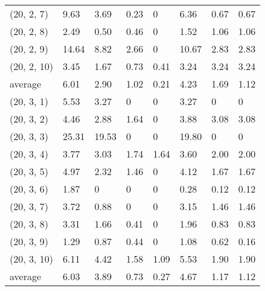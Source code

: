 \begin{appendices}
\begin{table}[H]
\begin{tabular}{  p{1.6cm} | p{0.8cm} | p{1cm} p{1cm} p{1cm} | p{1cm} p{1cm} p{1cm} }
(20, 2, 7) &  9.63  & 3.69  & 0.23  & 0  &6.36  & 0.67  & 0.67  \\
(20, 2, 8) &  2.49  & 0.50  &  0.46 &  0 &  1.52 &  1.06 &  1.06 \\
(20, 2, 9) &   14.64  & 8.82  &  2.66 & 0  & 10.67  & 2.83  &  2.83 \\
(20, 2, 10) &  3.45  & 1.67 & 0.73  & 0.41  & 3.24   & 3.24  & 3.24  \\
\midrule
average & 6.01   &2.90   & 1.02  &  0.21 &4.23  & 1.69  &  1.12 \\
\bottomrule
(20, 3, 1) & 5.53  & 3.27  & 0  &  0 & 3.27  & 0  &  0 \\
(20, 3, 2) &  4.46  & 2.88  &  1.64 &  0 &  3.88 & 3.08  & 3.08  \\
(20, 3, 3) &  25.31  &  19.53 & 0  &  0 &  19.80 & 0   & 0  \\
(20, 3, 4) & 3.77   & 3.03  & 1.74  &  1.64 & 3.60 & 2.00  &  2.00 \\
(20, 3, 5) &  4.97  &  2.32 & 1.46  &  0 &  4.12 & 1.67  & 1.67  \\
(20, 3, 6) &  1.87  &0   & 0  & 0  & 0.28  &  0.12 &  0.12 \\
(20, 3, 7) & 3.72   & 0.88  & 0  & 0  &  3.15 &  1.46 & 1.46  \\
(20, 3, 8) &  3.31  &  1.66 & 0.41  &  0 & 1.96  & 0.83  & 0.83  \\
(20, 3, 9) &  1.29  & 0.87  & 0.44  &  0 & 1.08  &  0.62 & 0.16  \\
(20, 3, 10) & 6.11   & 4.42  & 1.58  &  1.09 &  5.53 & 1.90  &  1.90 \\
\midrule
average &  6.03  & 3.89  & 0.73  &  0.27 &  4.67 & 1.17  & 1.12  \\
\bottomrule
 \end{tabular}
\end{table}





\end{appendices}
